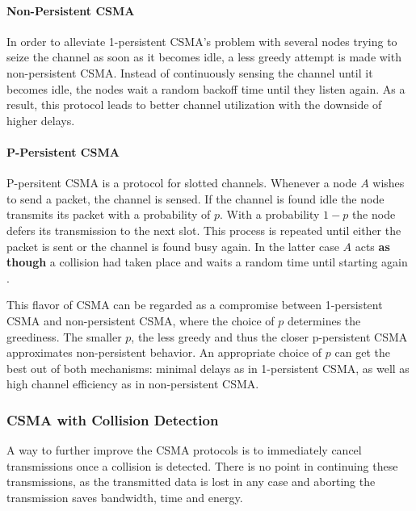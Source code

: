 \paragraph{Non-Persistent CSMA}

In order to alleviate 1-persistent CSMA's problem with several nodes trying to seize the channel as soon as it becomes idle, a less greedy attempt is made with non-persistent CSMA. Instead of continuously sensing the channel until it becomes idle, the nodes wait a random backoff time until they listen again. As a result, this protocol leads to better channel utilization with the downside of higher delays.

\paragraph{P-Persistent CSMA}

P-persitent CSMA is a protocol for slotted channels. Whenever a node $A$ wishes to send a packet, the channel is sensed. If the channel is found idle the node transmits its packet with a probability of $p$. With a probability $1-p$ the node defers its transmission to the next slot. This process is repeated until either the packet is sent or the channel is found busy again. In the latter case $A$ acts \textbf{as though} a collision had taken place and waits a random time until starting again \cite{Tanenbaum02}.

This flavor of CSMA can be regarded as a compromise between 1-persistent CSMA and non-persistent CSMA, where the choice of $p$ determines the greediness. The smaller $p$, the less greedy and thus the closer p-persistent CSMA approximates non-persistent behavior. An appropriate choice of $p$ can get the best out of both mechanisms: minimal delays as in 1-persistent CSMA, as well as high channel efficiency as in non-persistent CSMA.

\subsubsection{CSMA with Collision Detection}

A way to further improve the CSMA protocols is to immediately cancel transmissions once a collision is detected. There is no point in continuing these transmissions, as the transmitted data is lost in any case and aborting the transmission saves bandwidth, time and energy. 

